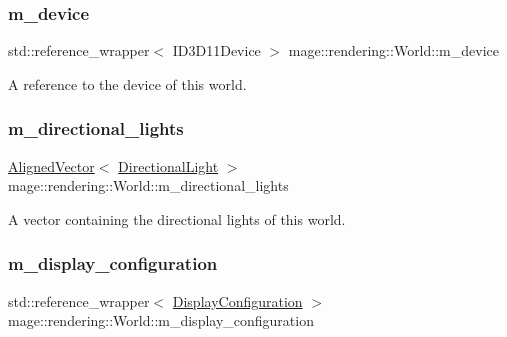 \subsubsection{\texorpdfstring{m\+\_\+device}{m\_device}}
{\footnotesize\ttfamily std\+::reference\+\_\+wrapper$<$ I\+D3\+D11\+Device $>$ mage\+::rendering\+::\+World\+::m\+\_\+device\hspace{0.3cm}{\ttfamily [private]}}

A reference to the device of this world. \hypertarget{classmage_1_1rendering_1_1_world_a215d8925979f0cae6471315795f09cec}{}\label{classmage_1_1rendering_1_1_world_a215d8925979f0cae6471315795f09cec} 
\subsubsection{\texorpdfstring{m\+\_\+directional\+\_\+lights}{m\_directional\_lights}}
{\footnotesize\ttfamily \hyperlink{namespacemage_a8664bfb5ce2179fc64eae9f82c8a5ba8}{Aligned\+Vector}$<$ \hyperlink{classmage_1_1rendering_1_1_directional_light}{Directional\+Light} $>$ mage\+::rendering\+::\+World\+::m\+\_\+directional\+\_\+lights\hspace{0.3cm}{\ttfamily [private]}}

A vector containing the directional lights of this world. \hypertarget{classmage_1_1rendering_1_1_world_a1a3a7ddfc44d74195e60a9177d4f2f80}{}\label{classmage_1_1rendering_1_1_world_a1a3a7ddfc44d74195e60a9177d4f2f80} 
\subsubsection{\texorpdfstring{m\+\_\+display\+\_\+configuration}{m\_display\_configuration}}
{\footnotesize\ttfamily std\+::reference\+\_\+wrapper$<$ \hyperlink{classmage_1_1rendering_1_1_display_configuration}{Display\+Configuration} $>$ mage\+::rendering\+::\+World\+::m\+\_\+display\+\_\+configuration\hspace{0.3cm}{\ttfamily [private]}}

